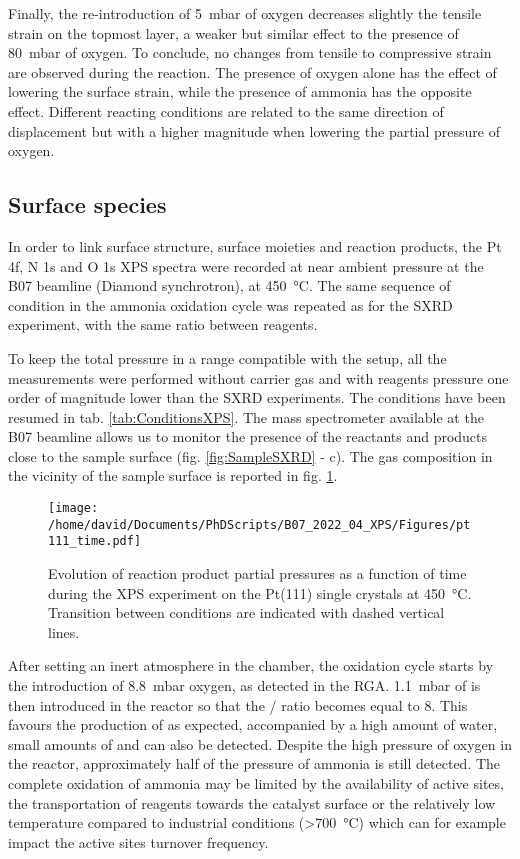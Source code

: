 Finally, the re-introduction of \qty{5}{\milli\bar} of oxygen decreases slightly the tensile strain on the topmost layer, a weaker but similar effect to the presence of \qty{80}{\milli\bar} of oxygen.
To conclude, no changes from tensile to compressive strain are observed during the reaction.
The presence of oxygen alone has the effect of lowering the surface strain, while the presence of ammonia has the opposite effect.
Different reacting conditions are related to the same direction of displacement but with a higher magnitude when lowering the partial pressure of oxygen.

\subsection{Surface species}

In order to link surface structure, surface moieties and reaction products, the Pt 4f, N 1s and O 1s XPS spectra were recorded at near ambient pressure at the B07 beamline (Diamond synchrotron), at \qty{450}{\degreeCelsius}.
The same sequence of condition in the ammonia oxidation cycle was repeated as for the SXRD experiment, with the same ratio between reagents.

To keep the total pressure in a range compatible with the setup, all the measurements were performed without carrier gas and with reagents pressure one order of magnitude lower than the SXRD experiments.
The conditions have been resumed in tab. \ref{tab:ConditionsXPS}.
The mass spectrometer available at the B07 beamline allows us to monitor the presence of the reactants and products close to the sample surface (fig. \ref{fig:SampleSXRD} - c).
The gas composition in the vicinity of the sample surface is reported in fig. \ref{fig:XPS111RGA}.

\begin{figure}[!htb]
    \centering
    \texttt{[image: /home/david/Documents/PhDScripts/B07\_2022\_04\_XPS/Figures/pt111\_time.pdf]}
    \caption{
        Evolution of reaction product partial pressures as a function of time during the XPS experiment on the Pt(111) single crystals at \qty{450}{\degreeCelsius}.
        Transition between conditions are indicated with dashed vertical lines.
    }
    \label{fig:XPS111RGA}
\end{figure}

After setting an inert atmosphere in the chamber, the oxidation cycle starts by the introduction of \qty{8.8}{\milli\bar} oxygen, as detected in the RGA.
\qty{1.1}{\milli\bar} of  is then introduced in the reactor so that the / ratio becomes equal to \num{8}.
This favours the production of  as expected, accompanied by a high amount of water, small amounts of  and  can also be detected.
Despite the high pressure of oxygen in the reactor, approximately half of the pressure of ammonia is still detected.
The complete oxidation of ammonia may be limited by the availability of active sites, the transportation of reagents towards the catalyst surface or the relatively low temperature compared to industrial conditions (\qty{>700}{\degreeCelsius}) which can for example impact the active sites turnover frequency.

